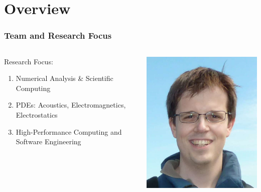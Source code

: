 \section{Overview}

\begin{frame}
    \frametitle{Team and Research Focus}
    \begin{columns}

        \begin{column}{0.5\textwidth}

        Research Focus:

            \begin{enumerate}
                \item Numerical Analysis \& Scientific Computing
                \item PDEs: Acoustics, Electromagnetics, Electrostatics
                \item High-Performance Computing and Software Engineering
            \end{enumerate}
        \end{column}
        \begin{column}{0.5\textwidth}
             \begin{center}
                \begin{minipage}{0.48\linewidth}
                   \includegraphics[width=\linewidth, height=1.1\linewidth]{assets/timo.png}

\end{minipage}
\end{center}
\end{column}
\end{columns}
\end{frame}
